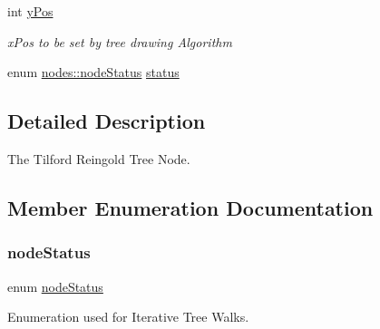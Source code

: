 \begin{DoxyCompactItemize}
int \hyperlink{structnodes_adbae1d6f68d046bbecaa7230baf64762}{y\+Pos}
\begin{DoxyCompactList}\small\item\em x\+Pos to be set by tree drawing Algorithm \end{DoxyCompactList}\item 
enum \hyperlink{structnodes_aab296cc56fa34a05b7d9d632a9ddef2a}{nodes\+::node\+Status} \hyperlink{structnodes_ac29e9133b53697ff2478fe001f7d7c74}{status}
\end{DoxyCompactItemize}


\subsection{Detailed Description}
The Tilford Reingold Tree Node. 

\subsection{Member Enumeration Documentation}
\hypertarget{structnodes_aab296cc56fa34a05b7d9d632a9ddef2a}{}\label{structnodes_aab296cc56fa34a05b7d9d632a9ddef2a} 
\subsubsection{\texorpdfstring{node\+Status}{nodeStatus}}
{\footnotesize\ttfamily enum \hyperlink{structnodes_aab296cc56fa34a05b7d9d632a9ddef2a}{node\+Status}}



Enumeration used for Iterative Tree Walks. 

